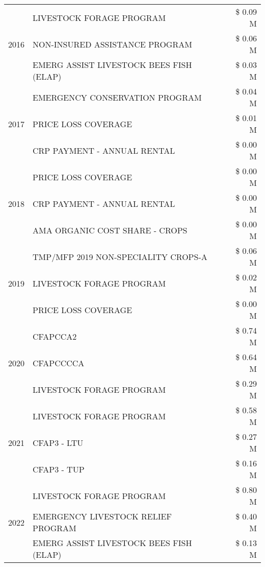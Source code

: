 \begin{tabular}{llr}
\cline{1-3}
\multirow[t]{3}{*}{2016} & LIVESTOCK FORAGE PROGRAM & \$ 0.09 M \\
 & NON-INSURED ASSISTANCE PROGRAM & \$ 0.06 M \\
 & EMERG ASSIST LIVESTOCK BEES FISH (ELAP) & \$ 0.03 M \\
\cline{1-3}
\multirow[t]{3}{*}{2017} & EMERGENCY CONSERVATION PROGRAM & \$ 0.04 M \\
 & PRICE LOSS COVERAGE & \$ 0.01 M \\
 & CRP PAYMENT - ANNUAL RENTAL & \$ 0.00 M \\
\cline{1-3}
\multirow[t]{3}{*}{2018} & PRICE LOSS COVERAGE & \$ 0.00 M \\
 & CRP PAYMENT - ANNUAL RENTAL & \$ 0.00 M \\
 & AMA ORGANIC COST SHARE - CROPS & \$ 0.00 M \\
\cline{1-3}
\multirow[t]{3}{*}{2019} & TMP/MFP 2019 NON-SPECIALITY CROPS-A & \$ 0.06 M \\
 & LIVESTOCK FORAGE PROGRAM & \$ 0.02 M \\
 & PRICE LOSS COVERAGE & \$ 0.00 M \\
\cline{1-3}
\multirow[t]{3}{*}{2020} & CFAPCCA2 & \$ 0.74 M \\
 & CFAPCCCCA & \$ 0.64 M \\
 & LIVESTOCK FORAGE PROGRAM & \$ 0.29 M \\
\cline{1-3}
\multirow[t]{3}{*}{2021} & LIVESTOCK FORAGE PROGRAM & \$ 0.58 M \\
 & CFAP3 - LTU & \$ 0.27 M \\
 & CFAP3 - TUP & \$ 0.16 M \\
\cline{1-3}
\multirow[t]{3}{*}{2022} & LIVESTOCK FORAGE PROGRAM & \$ 0.80 M \\
 & EMERGENCY LIVESTOCK RELIEF PROGRAM & \$ 0.40 M \\
 & EMERG ASSIST LIVESTOCK BEES FISH (ELAP) & \$ 0.13 M \\
\cline{1-3}
\bottomrule
\end{tabular}
